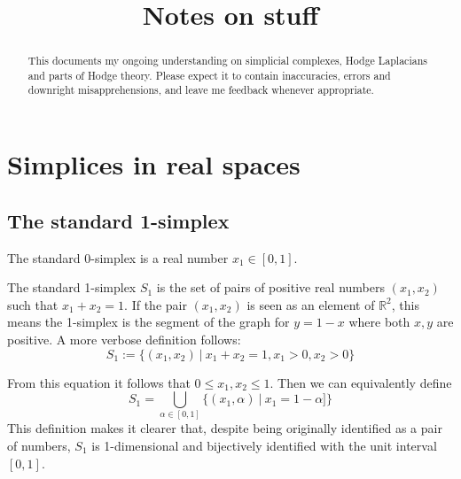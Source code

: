 \documentclass{tufte-handout}
\title{Notes on stuff}
\author[Diego Navarro}
\date{}
\newcommand{\re}{\mathbb{R}}
\begin{document}
\maketitle%

\begin{abstract}
\noindent This documents my ongoing understanding on simplicial complexes, Hodge Laplacians and parts of Hodge theory. Please expect it to contain inaccuracies, errors and downright misapprehensions, and leave me feedback whenever appropriate. 
\end{abstract}

\section{Simplices in real spaces}

\subsection{The standard 1-simplex}
The standard 0-simplex is a real number $x_1\in[0,1]$.

The standard 1-simplex $S_1$ is the set of pairs of positive real numbers $(x_1,x_2)$ such that $x_1+x_2=1$. If the pair $(x_1, x_2)$ is seen as an element of $\re^2$, this means the 1-simplex is the segment of the graph for $y=1-x$ where both $x,y$ are positive. A more verbose definition follows:
\begin{equation}
    S_1 := \{(x_1,x_2)\ |\ x_1+x_2=1, x_1>0, x_2>0\}
\end{equation}

 From this equation it follows that $0\leq x_1, x_2\leq 1$. Then we can equivalently define 
\begin{equation}
    S_1 = \bigcup_{\alpha\in [0,1]} \{{(x_1,\alpha)}\ |\ x_1 = 1-\alpha]\}
\label{union-1}
\end{equation}
This definition makes it clearer that, despite being originally identified as a pair of numbers, $S_1$ is 1-dimensional and bijectively identified with the unit interval $[0,1]$. 
\end{document}
